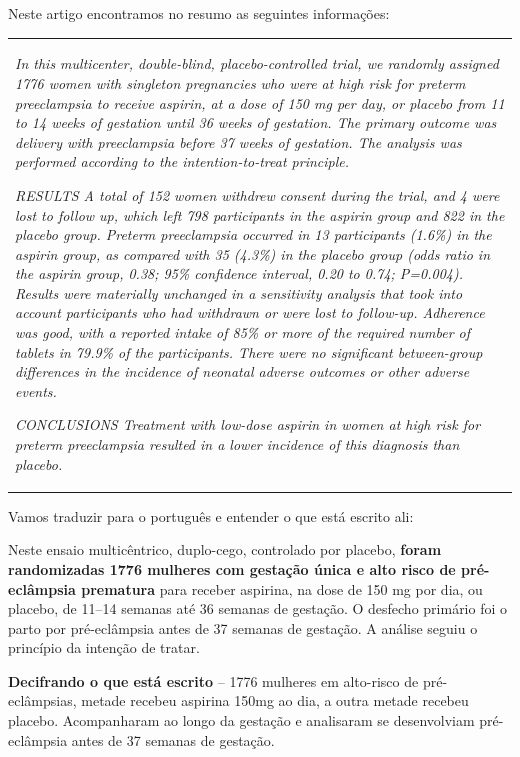 \documentclass[
  letterpaper,
  DIV=11,
  numbers=noendperiod]{scrreprt}
\begin{document}
Neste artigo encontramos no resumo as seguintes informações:

\begin{longtable}[]{@{}
  >{\raggedright\arraybackslash}p{}@{}}
\toprule\noalign{}
\endhead
\bottomrule\noalign{}
\endlastfoot
\emph{In this multicenter, double-blind, placebo-controlled trial, we
randomly assigned 1776 women with singleton pregnancies who were at high
risk for preterm preeclampsia to receive aspirin, at a dose of 150 mg
per day, or placebo from 11 to 14 weeks of gestation until 36 weeks of
gestation. The primary outcome was delivery with preeclampsia before 37
weeks of gestation. The analysis was performed according to the
intention-to-treat principle.}

\emph{RESULTS A total of 152 women withdrew consent during the trial,
and 4 were lost to follow up, which left 798 participants in the aspirin
group and 822 in the placebo group. Preterm preeclampsia occurred in 13
participants (1.6\%) in the aspirin group, as compared with 35 (4.3\%)
in the placebo group (odds ratio in the aspirin group, 0.38; 95\%
confidence interval, 0.20 to 0.74; P=0.004). Results were materially
unchanged in a sensitivity analysis that took into account participants
who had withdrawn or were lost to follow-up. Adherence was good, with a
reported intake of 85\% or more of the required number of tablets in
79.9\% of the participants. There were no significant between-group
differences in the incidence of neonatal adverse outcomes or other
adverse events.}

\emph{CONCLUSIONS Treatment with low-dose aspirin in women at high risk
for preterm preeclampsia resulted in a lower incidence of this diagnosis
than placebo.} \\
\end{longtable}

Vamos traduzir para o português e entender o que está escrito ali:

Neste ensaio multicêntrico, duplo-cego, controlado por placebo,
\textbf{foram randomizadas 1776 mulheres com gestação única e alto risco
de pré-eclâmpsia prematura} para receber aspirina, na dose de 150 mg por
dia, ou placebo, de 11--14 semanas até 36 semanas de gestação. O
desfecho primário foi o parto por pré-eclâmpsia antes de 37 semanas de
gestação. A análise seguiu o princípio da intenção de tratar.

\textbf{Decifrando o que está escrito} -- 1776 mulheres em alto-risco de
pré-eclâmpsias, metade recebeu aspirina 150mg ao dia, a outra metade
recebeu placebo. Acompanharam ao longo da gestação e analisaram se
desenvolviam pré-eclâmpsia antes de 37 semanas de gestação.
\end{document}
